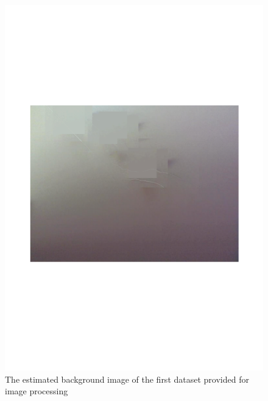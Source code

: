 \documentclass{article}
\begin{document}
\begin{figure}[h!]
\begin{minipage}[b]{0.5\linewidth}
\includegraphics[scale=0.4]{../Drawings/backdata1.pdf}
\caption{The estimated background image of the first dataset provided for image processing}
\label{fig:backdata1}
\end{minipage}
\hspace{0.5cm}
\begin{minipage}[b]{0.5\linewidth}

\end{minipage}
\end{figure}
\end{document}
